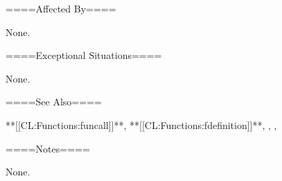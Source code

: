 ====Affected By====

None.

====Exceptional Situations====

None.

====See Also====

**[[CL:Functions:funcall]]**, **[[CL:Functions:fdefinition]]**, , {\secref\Evaluation}, {\secref\SETFofAPPLY}

====Notes====

None.

  
